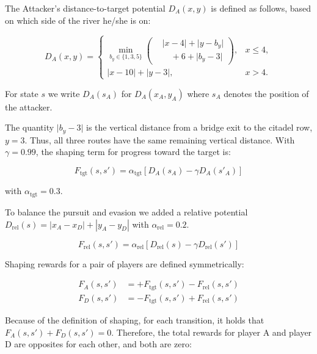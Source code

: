 \documentclass[conference]{IEEEtran}
\begin{document}
The Attacker's distance-to-target potential $D_A(x,y)$ is defined as follows, based on which side of the river he/she is on:

\begin{equation}
D_A(x,y) =
\begin{cases}
\displaystyle\min_{b_y \in \{1,3,5\}}
\left(\begin{aligned}
&\lvert x - 4\rvert + \lvert y - b_y\rvert\\
&\quad + 6 + \lvert b_y - 3\rvert
\end{aligned}\right), & x \le 4, \\
\lvert x - 10\rvert + \lvert y - 3\rvert, & x > 4.
\end{cases}
\end{equation}

For state $s$ we write $D_A(s_A)$ for $D_A(x_A,y_A)$ where $s_A$ denotes the position of the attacker.

The quantity \(\lvert b_y-3\rvert\) is the vertical distance from a bridge exit to the citadel row, \(y=3\). Thus, all three routes have the same remaining vertical distance. With \(\gamma=0.99\), the shaping term for progress toward the target is:

\begin{equation}\label{eq:shaping_tgt}
F_{\text{tgt}}(s,s') = \alpha_{\text{tgt}} \left[ D_A(s_A) - \gamma D_A(s'_A) \right]
\end{equation}

with $\alpha_{\text{tgt}} = 0.3$.

To balance the pursuit and evasion we added a relative potential $D_{\text{rel}}(s) = |x_A - x_D| + |y_A - y_D|$ with $\alpha_{\text{rel}} = 0.2$.

\begin{equation}
F_{\text{rel}}(s, s') = \alpha_{\text{rel}} \left[ D_{\text{rel}}(s) - \gamma D_{\text{rel}}(s') \right]
\label{eq:shaping_rel}
\end{equation}

 Shaping rewards for a pair of players are defined symmetrically:

\begin{align}
F_A(s, s') &= +F_{\text{tgt}}(s, s') - F_{\text{rel}}(s, s') \\
F_D(s, s') &= -F_{\text{tgt}}(s, s') + F_{\text{rel}}(s, s')
\end{align}

Because of the definition of shaping, for each transition, it holds that $F_A(s,s') + F_D(s,s') = 0$. Therefore, the total rewards for player A and player D are opposites for each other, and both are zero:
\end{document}
